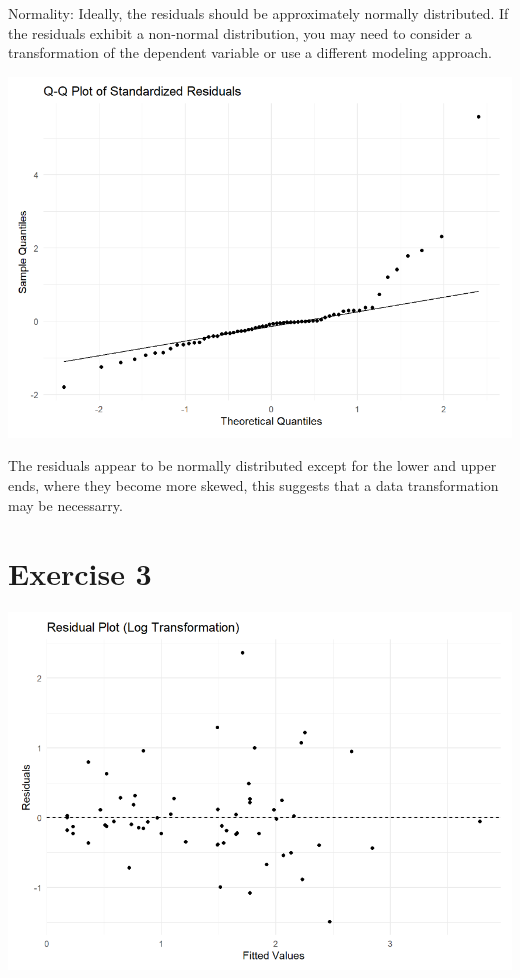 \documentclass{article}
\begin{document}
Normality: Ideally, the residuals should be approximately normally distributed. If the residuals exhibit a non-normal distribution, you may need to consider a transformation of the dependent variable or use a different modeling approach.

\begin{center}
\includegraphics[scale=0.5]{graphs/qq-residuals.png}
\end{center}

The residuals appear to be normally distributed except for the lower and upper ends, where they become more skewed, this suggests that a data transformation may be necessarry.


\section{Exercise 3}

\begin{center}
\includegraphics[scale=0.5]{graphs/graph-log.png}
\end{center}
\end{document}
